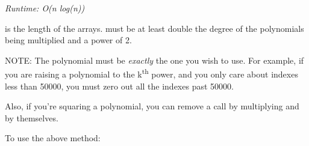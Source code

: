 
\textit{Runtime: O(n log(n))}

 is the length of the arrays.  must be at least double the degree of the polynomials being multiplied and a power of 2. 

NOTE: The polynomial must be \textit{exactly} the one you wish to use. For example, if you are raising a polynomial to the k\textsuperscript{th} power, and you only care about indexes less than 50000, you must zero out all the indexes past 50000.

Also, if you're squaring a polynomial, you can remove a  call by multiplying  and  by themselves.



To use the above method:




\newpage